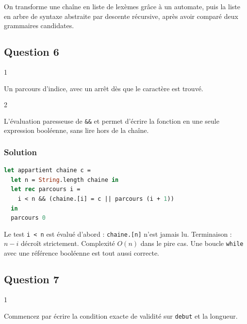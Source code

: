 \documentclass[11pt,a4paper]{article}
\begin{document}
On transforme une chaîne en liste de lexèmes grâce à un automate, puis la liste en arbre de syntaxe abstraite par descente récursive, après avoir comparé deux grammaires candidates.

\hypertarget{question-6}{%
\subsection{Question 6}\label{question-6}}

\begin{indication}{1}

Un parcours d'indice, avec un arrêt dès que le caractère est trouvé.

\end{indication}

\begin{indication}{2}

L'évaluation paresseuse de \texttt{\&\&} et \texttt{\textbar{}\textbar{}} permet d'écrire la fonction en une seule expression booléenne, sans lire hors de la chaîne.

\end{indication}

\hypertarget{solution-5}{%
\subsubsection{Solution}\label{solution-5}}

\begin{lstlisting}[language=Caml]
let appartient chaine c =
  let n = String.length chaine in
  let rec parcours i =
    i < n && (chaine.[i] = c || parcours (i + 1))
  in
  parcours 0
\end{lstlisting}

Le test \texttt{i\ \textless{}\ n} est évalué d'abord : \texttt{chaine.{[}n{]}} n'est jamais lu. Terminaison : \(n-i\) décroît strictement. Complexité \(O(n)\) dans le pire cas. Une boucle \texttt{while} avec une référence booléenne est tout aussi correcte.

\hypertarget{question-7}{%
\subsection{Question 7}\label{question-7}}

\begin{indication}{1}

Commencez par écrire la condition exacte de validité sur \texttt{debut} et la longueur.

\end{indication}
\end{document}
